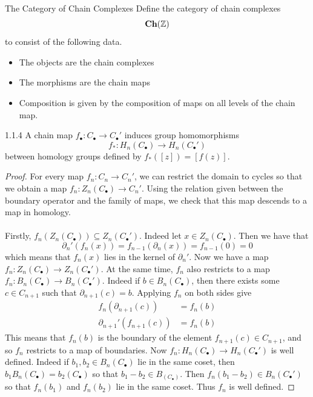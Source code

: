 \documentclass[a4paper]{article}
\begin{document}
\begin{defn}{The Category of Chain Complexes}{} Define the category of chain complexes $$\bold{Ch}(\mathbb{Z})$$ to consist of the following data. 
\begin{itemize}
\item The objects are the chain complexes
\item The morphisms are the chain maps
\item Composition is given by the composition of maps on all levels of the chain map. 
\end{itemize}
\end{defn}

\begin{lmm}{}{1.1.4} A chain map $f_\bullet:C_\bullet\to C_\bullet'$ induces group homomorphisms $$f_\ast:H_n(C_\bullet)\to H_n(C_\bullet')$$ between homology groups defined by $f_\ast([z])=[f(z)]$. \tcbline
\begin{proof}
For every map $f_n:C_n\to C_n'$, we can restrict the domain to cycles so that we obtain a map $f_n:Z_n(C_\bullet)\to C_n'$. Using the relation given between the boundary operator and the family of maps, we check that this map descends to a map in homology. \\~\\

Firstly, $f_n(Z_n(C_\bullet))\subseteq Z_n(C_\bullet')$. Indeed let $x\in Z_n(C_\bullet)$. Then we have that $$\partial_n'(f_n(x))=f_{n-1}(\partial_n(x))=f_{n-1}(0)=0$$ which means that $f_n(x)$ lies in the kernel of $\partial_n'$. Now we have a map $f_n:Z_n(C_\bullet)\to Z_n(C_\bullet')$. At the same time, $f_n$ also restricts to a map $f_n:B_n(C_\bullet)\to B_n(C_\bullet')$. Indeed if $b\in B_n(C_\bullet)$, then there exists some $c\in C_{n+1}$ such that $\partial_{n+1}(c)=b$. Applying $f_n$ on both sides give 
\begin{align*}
f_n(\partial_{n+1}(c))&=f_n(b)\\
\partial_{n+1}'(f_{n+1}(c))&=f_n(b)
\end{align*}
This means that $f_n(b)$ is the boundary of the element $f_{n+1}(c)\in C_{n+1}$, and so $f_n$ restricts to a map of boundaries. Now $f_n:H_n(C_\bullet)\to H_n(C_\bullet')$ is well defined. Indeed if $b_1,b_2\in B_n(C_\bullet)$ lie in the same coset, then $b_1B_n(C_\bullet)=b_2(C_\bullet)$ so that $b_1-b_2\in B_(C_\bullet)$. Then $f_n(b_1-b_2)\in B_n(C_\bullet')$ so that $f_n(b_1)$ and $f_n(b_2)$ lie in the same coset. Thus $f_n$ is well defined. 
\end{proof}
\end{lmm}
\end{document}
